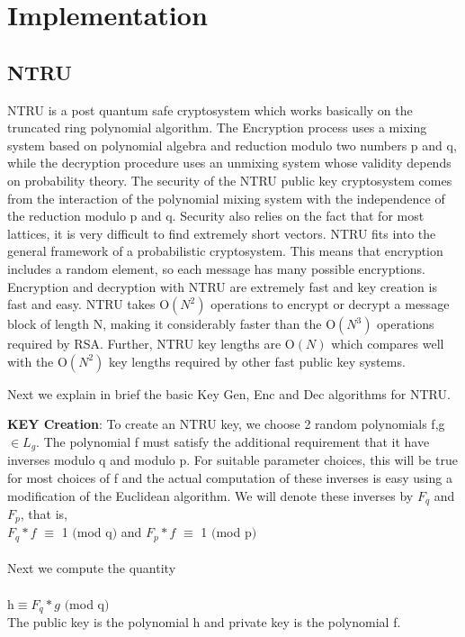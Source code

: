 \documentclass[conference]{IEEEtran}
\begin{document}
\section{Implementation}

\subsection{NTRU}
NTRU is a post quantum safe cryptosystem which works basically on the truncated ring polynomial algorithm. The Encryption process uses a mixing system based on polynomial algebra and reduction modulo two numbers p and q, while the decryption procedure uses an unmixing system whose validity depends on probability theory. The security of the NTRU public key cryptosystem comes from the interaction of the polynomial mixing system with the independence of the reduction modulo p and q. Security also relies on the fact that for most lattices, it is very difficult to find extremely short vectors.
NTRU fits into the general framework of a probabilistic cryptosystem. This means that encryption includes a random element, so each message has many possible encryptions. Encryption and decryption with NTRU are extremely fast and key creation is fast and easy. NTRU takes O$(N^2)$ operations to encrypt or decrypt a message block of length N, making it considerably faster than the O$(N^3)$ operations required by RSA. Further, NTRU key lengths are O$(N)$ which compares well with the O$(N^2)$ key lengths required by other fast public key systems.

Next we explain in brief the basic Key Gen, Enc and Dec algorithms for NTRU.

\textbf{KEY Creation}: To create an NTRU key, we choose 2 random polynomials f,g $ \in L_g$. The polynomial f must satisfy the additional requirement that it have inverses modulo q and modulo p. For suitable parameter choices, this will be true for most choices of f and the actual computation of these inverses is easy using a modification of the Euclidean algorithm. We will denote these inverses by $F_q$ and $F_p$, that is,\\

 $F_q * f$ $\equiv$ 1 $\big($mod q$\big)$ and $F_p * f$ $\equiv$ 1 $\big($mod p$\big)$ \\
\\
Next we compute the quantity \\
\\ h$\equiv F_q * g$ $\big($mod q$\big)$ \\
The public key is the polynomial h and private key is the polynomial f.
\end{document}
